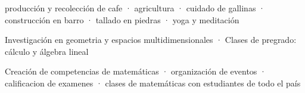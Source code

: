 \documentclass[]{plushcv}
\begin{document}
\begin{minipage}[t]{0.70\textwidth}

\sectionsep
{}
\begin{tightemize}
  \sectionsep
\item producción y recolección de cafe · agricultura · cuidado de gallinas · construcción en barro · tallado en piedras  ·  yoga y meditación
\end{tightemize}
\sectionsep




\sectionsep
{}
\begin{tightemize}
  \sectionsep
\item Investigación en geometria y espacios multidimensionales   ·  Clases de pregrado: cálculo y álgebra lineal
  
\end{tightemize}
\sectionsep


\sectionsep
{}
\begin{tightemize}
  \sectionsep
\item Creación de competencias de matemáticas  ·  organización de eventos ·  calificacion de examenes  ·  clases de matemáticas con estudiantes de todo el país  
\end{tightemize}
\sectionsep







\end{minipage}
\end{document}
